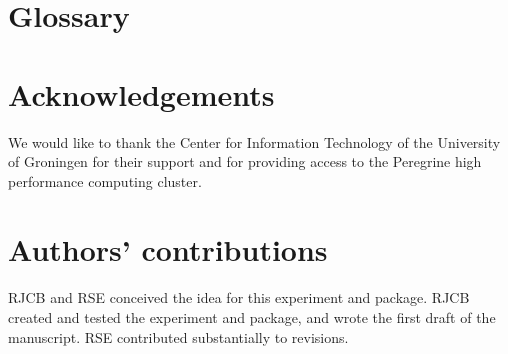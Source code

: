 \documentclass{article}
\begin{document}
\section{Glossary}


\section{Acknowledgements}

We would like to thank the Center for Information Technology of the University of Groningen for their support
and for providing access to the Peregrine high performance computing cluster.

\section{Authors' contributions}

RJCB and RSE conceived the idea for this experiment and package. 
RJCB created and tested the experiment and package, 
and wrote the first draft of the manuscript. 
RSE contributed substantially to revisions.




\appendix
\end{document}
